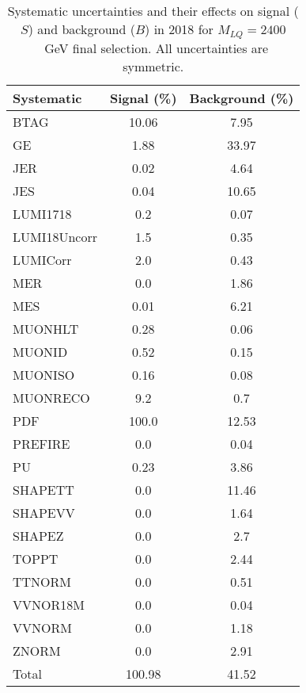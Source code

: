 \begin{table}[htbp]
\begin{center}
\caption{Systematic uncertainties and their effects on signal ($S$) and background ($B$) in 2018 for $M_{LQ}=2400$~GeV final selection. All uncertainties are symmetric.}
\begin{tabular}{lcc}
\hline\hline
Systematic & Signal (\%) & Background (\%) \\ \hline 
BTAG & 10.06 & 7.95\\ 
GE & 1.88 & 33.97\\ 
JER & 0.02 & 4.64\\ 
JES & 0.04 & 10.65\\ 
LUMI1718 & 0.2 & 0.07\\ 
LUMI18Uncorr & 1.5 & 0.35\\ 
LUMICorr & 2.0 & 0.43\\ 
MER & 0.0 & 1.86\\ 
MES & 0.01 & 6.21\\ 
MUONHLT & 0.28 & 0.06\\ 
MUONID & 0.52 & 0.15\\ 
MUONISO & 0.16 & 0.08\\ 
MUONRECO & 9.2 & 0.7\\ 
PDF & 100.0 & 12.53\\ 
PREFIRE & 0.0 & 0.04\\ 
PU & 0.23 & 3.86\\ 
SHAPETT & 0.0 & 11.46\\ 
SHAPEVV & 0.0 & 1.64\\ 
SHAPEZ & 0.0 & 2.7\\ 
TOPPT & 0.0 & 2.44\\ 
TTNORM & 0.0 & 0.51\\ 
VVNOR18M & 0.0 & 0.04\\ 
VVNORM & 0.0 & 1.18\\ 
ZNORM & 0.0 & 2.91\\ 
Total & 100.98 & 41.52\\ \hline \hline
\end{tabular}
\label{tab:SysUncertainties_uujj_2400}
\end{center}
\end{table}

